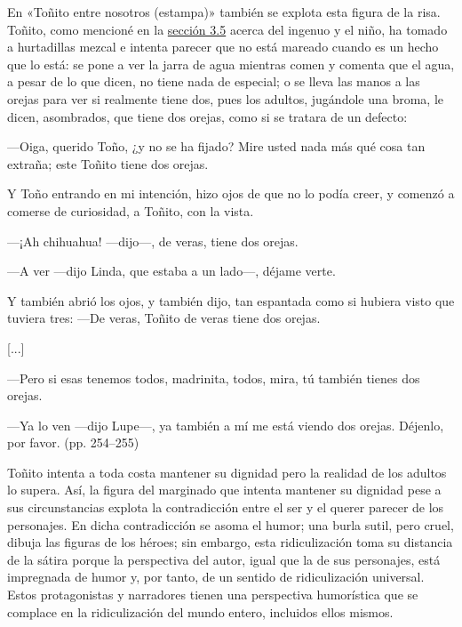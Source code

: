 \documentclass[14pt,twoside,final]{extbook} %
\begin{document}
En «Toñito entre nosotros (estampa)» también se explota esta figura de la risa. Toñito, como mencioné en la \hyperref[sec:el-ingenuo-el-nino]{sección 3.5} acerca del ingenuo y el niño, ha tomado a hurtadillas mezcal e intenta parecer que no está mareado cuando es un hecho que lo está: se pone a ver la jarra de agua mientras comen y comenta que el agua, a pesar de lo que dicen, no tiene nada de especial; o se lleva las manos a las orejas para ver si realmente tiene dos, pues los adultos, jugándole una broma, le dicen, asombrados, que tiene dos orejas, como si se tratara de un defecto:
\begin{quoting}
---Oiga, querido Toño, ¿y no se ha fijado? Mire usted nada más qué cosa tan extraña; este Toñito tiene dos orejas.

Y Toño entrando en mi intención, hizo ojos de que no lo podía creer, y comenzó a comerse de curiosidad, a Toñito, con la vista.

---¡Ah chihuahua! ---dijo---, de veras, tiene dos orejas.

---A ver ---dijo Linda, que estaba a un lado---, déjame verte.

Y también abrió los ojos, y también dijo, tan espantada como si hubiera visto que tuviera tres: ---De veras, Toñito de veras tiene dos orejas.

\centerline{[...]}

---Pero si esas tenemos todos, madrinita, todos, mira, tú también tienes dos orejas.

---Ya lo ven ---dijo Lupe---, ya también a mí me está viendo dos orejas. Déjenlo, por favor. (pp. 254--255)
\end{quoting}
Toñito intenta a toda costa mantener su dignidad pero la realidad de los adultos lo supera. Así, la figura del marginado que intenta mantener su dignidad pese a sus circunstancias explota la contradicción entre el ser y el querer parecer de los personajes. En dicha contradicción se asoma el
humor; una burla sutil, pero cruel, dibuja las figuras de los héroes; sin embargo, esta ridiculización toma su distancia de la sátira porque la perspectiva del autor, igual que la de sus personajes, está impregnada de humor y, por tanto, de un sentido de ridiculización universal. Estos protagonistas y narradores tienen una perspectiva humorística que se complace en la ridiculización del mundo entero, incluidos ellos mismos.
\cleardoublepage
\newpage
\pagestyle{empty}
\vspace*{42pt}
\end{document}
